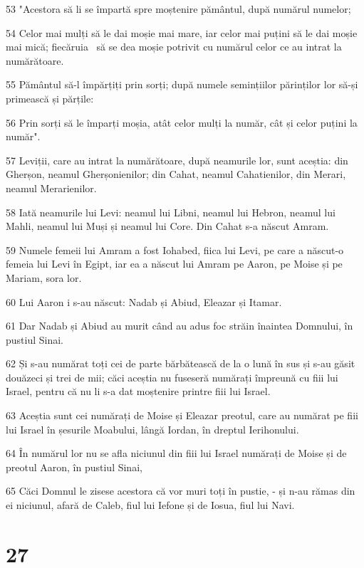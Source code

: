 \par 53 "Acestora să li se împartă spre moștenire pământul, după numărul numelor;
\par 54 Celor mai mulți să le dai moșie mai mare, iar celor mai puțini să le dai moșie mai mică; fiecăruia  să se dea moșie potrivit cu numărul celor ce au intrat la numărătoare.
\par 55 Pământul să-l împărțiți prin sorți; după numele semințiilor părinților lor să-și primească și părțile:
\par 56 Prin sorți să le împarți moșia, atât celor mulți la număr, cât și celor puțini la număr".
\par 57 Leviții, care au intrat la numărătoare, după neamurile lor, sunt aceștia: din Gherșon, neamul Gherșonienilor; din Cahat, neamul Cahatienilor, din Merari, neamul Merarienilor.
\par 58 Iată neamurile lui Levi: neamul lui Libni, neamul lui Hebron, neamul lui Mahli, neamul lui Muși și neamul lui Core. Din Cahat s-a născut Amram.
\par 59 Numele femeii lui Amram a fost Iohabed, fiica lui Levi, pe care a născut-o femeia lui Levi în Egipt, iar ea a născut lui Amram pe Aaron, pe Moise și pe Mariam, sora lor.
\par 60 Lui Aaron i s-au născut: Nadab și Abiud, Eleazar și Itamar.
\par 61 Dar Nadab și Abiud au murit când au adus foc străin înaintea Domnului, în pustiul Sinai.
\par 62 Și s-au numărat toți cei de parte bărbătească de la o lună în sus și s-au găsit douăzeci și trei de mii; căci aceștia nu fuseseră numărați împreună cu fiii lui Israel, pentru că nu li s-a dat moștenire printre fiii lui Israel.
\par 63 Aceștia sunt cei numărați de Moise și Eleazar preotul, care au numărat pe fiii lui Israel în șesurile Moabului, lângă Iordan, în dreptul Ierihonului.
\par 64 În numărul lor nu se afla niciunul din fiii lui Israel numărați de Moise și de preotul Aaron, în pustiul Sinai,
\par 65 Căci Domnul le zisese acestora că vor muri toți în pustie, - și n-au rămas din ei niciunul, afară de Caleb, fiul lui Iefone și de Iosua, fiul lui Navi.

\chapter{27}

